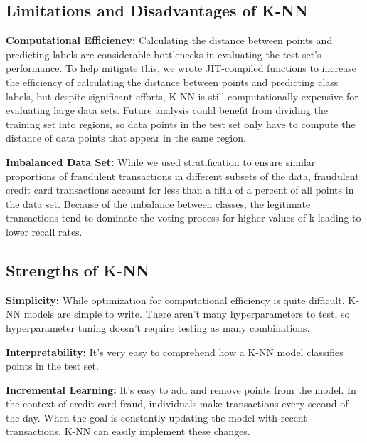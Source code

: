 \documentclass{article}
\begin{document}
\subsection{Limitations and Disadvantages of K-NN}

\textbf{Computational Efficiency:} Calculating the distance between points and predicting labels are considerable bottlenecks in evaluating the test set's performance. To help mitigate this, we wrote JIT-compiled functions to increase the efficiency of calculating the distance between points and predicting class labels, but despite significant efforts, K-NN is still computationally expensive for evaluating large data sets. Future analysis could benefit from dividing the training set into regions, so data points in the test set only have to compute the distance of data points that appear in the same region.

\textbf{Imbalanced Data Set:} While we used stratification to ensure similar proportions of fraudulent transactions in different subsets of the data, fraudulent credit card transactions account for less than a fifth of a percent of all points in the data set. Because of the imbalance between classes, the legitimate transactions tend to dominate the voting process for higher values of k leading to lower recall rates.

\subsection{Strengths of K-NN}

\textbf{Simplicity:} While optimization for computational efficiency is quite difficult, K-NN models are simple to write. There aren’t many hyperparameters to test, so hyperparameter tuning doesn’t require testing as many combinations.

\textbf{Interpretability:} It’s very easy to comprehend how a K-NN model classifies points in the test set.

\textbf{Incremental Learning:} It’s easy to add and remove points from the model. In the context of credit card fraud, individuals make transactions every second of the day. When the goal is constantly updating the model with recent transactions, K-NN can easily implement these changes.
\end{document}
